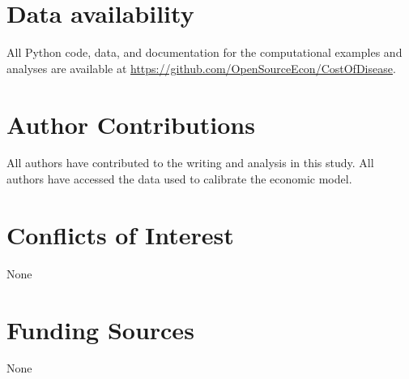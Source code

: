 \documentclass[letterpaper,12pt]{article}
\theoremstyle{definition}
\begin{document}
\section*{Data availability}
All Python code, data, and documentation for the computational examples and analyses are available at \href{https://github.com/OpenSourceEcon/CostOfDisease}{https://github.com/OpenSourceEcon/CostOfDisease}.

\section*{Author Contributions}
All authors have contributed to the writing and analysis in this study. All authors have accessed the data used to calibrate the economic model.

\section*{Conflicts of Interest}
None

\section*{Funding Sources}
None



\end{document}
